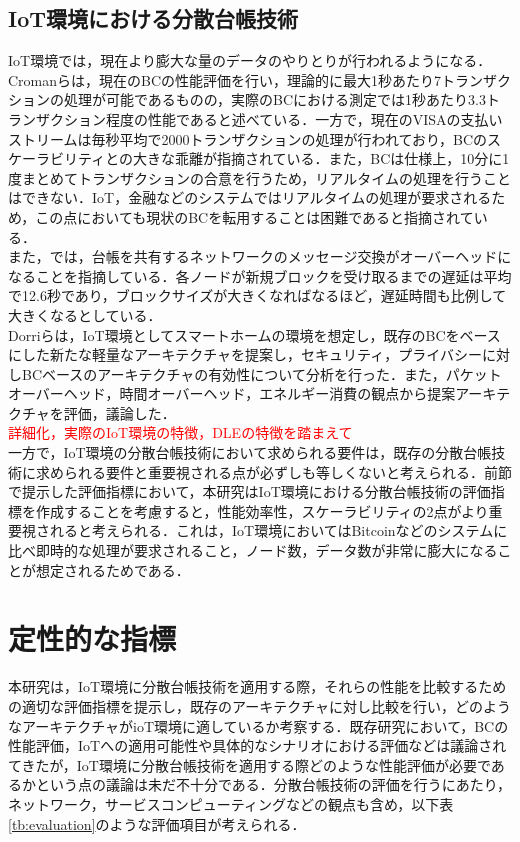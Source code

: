 \documentclass[japanese, macos]{KU2}
\begin{document}
\section{IoT環境における分散台帳技術}
IoT環境では，現在より膨大な量のデータのやりとりが行われるようになる．Cromanらは，現在のBCの性能評価を行い，理論的に最大1秒あたり7トランザクションの処理が可能であるものの，実際のBCにおける測定では1秒あたり3.3トランザクション程度の性能であると述べている\cite{croman2016scaling}．一方で，現在のVISAの支払いストリームは毎秒平均で2000トランザクションの処理が行われており，BCのスケーラビリティとの大きな乖離が指摘されている．また，BCは仕様上，10分に1度まとめてトランザクションの合意を行うため，リアルタイムの処理を行うことはできない．IoT，金融などのシステムではリアルタイムの処理が要求されるため，この点においても現状のBCを転用することは困難であると指摘されている．\\
また，\cite{decker2013information}では，台帳を共有するネットワークのメッセージ交換がオーバーヘッドになることを指摘している．各ノードが新規ブロックを受け取るまでの遅延は平均で12.6秒であり，ブロックサイズが大きくなればなるほど，遅延時間も比例して大きくなるとしている．\\
Dorriらは，IoT環境としてスマートホームの環境を想定し，既存のBCをベースにした新たな軽量なアーキテクチャを提案し，セキュリティ，プライバシーに対しBCベースのアーキテクチャの有効性について分析を行った\cite{dorri2017blockchain}．また，パケットオーバーヘッド，時間オーバーヘッド，エネルギー消費の観点から提案アーキテクチャを評価，議論した．\\
\textcolor{red}{詳細化，実際のIoT環境の特徴，DLEの特徴を踏まえて}\\

一方で，IoT環境の分散台帳技術において求められる要件は，既存の分散台帳技術に求められる要件と重要視される点が必ずしも等しくないと考えられる．前節で提示した評価指標において，本研究はIoT環境における分散台帳技術の評価指標を作成することを考慮すると，性能効率性，スケーラビリティの2点がより重要視されると考えられる．これは，IoT環境においてはBitcoinなどのシステムに比べ即時的な処理が要求されること，ノード数，データ数が非常に膨大になることが想定されるためである．


\chapter{定性的な指標}
本研究は，IoT環境に分散台帳技術を適用する際，それらの性能を比較するための適切な評価指標を提示し，既存のアーキテクチャに対し比較を行い，どのようなアーキテクチャがioT環境に適しているか考察する．既存研究において，BCの性能評価，IoTへの適用可能性や具体的なシナリオにおける評価などは議論されてきたが，IoT環境に分散台帳技術を適用する際どのような性能評価が必要であるかという点の議論は未だ不十分である．分散台帳技術の評価を行うにあたり，ネットワーク，サービスコンピューティングなどの観点も含め，以下表\ref{tb:evaluation}のような評価項目が考えられる．
\end{document}
